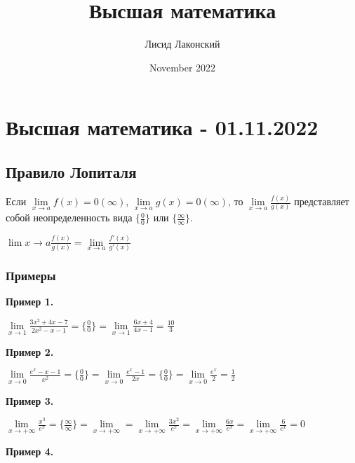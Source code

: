 \documentclass{article}
\title{Высшая математика}
\author{Лисид Лаконский}
\date{November 2022}
\begin{document}
\maketitle

\tableofcontents
\pagebreak

\section{Высшая математика - 01.11.2022}

\subsection{Правило Лопиталя}

\begin{flushleft}

Если $\lim\limits_{x \to a} f(x) = 0 (\infty)$, $\lim\limits_{x \to a} g(x) = 0 (\infty)$, то $\lim\limits_{x \to a} \frac{f(x)}{g(x)}$ представляет собой неопределенность вида $\{ \frac{0}{0} \}$ или $\{ \frac{\infty}{\infty} \}$.

\hfill

$\lim\limits{x \to a} \frac{f(x)}{g(x)} = \lim\limits_{x \to a} \frac{f'(x)}{g'(x)}$

\subsubsection{Примеры}

\textbf{Пример 1.}

$\lim\limits_{x \to 1} \frac{3x^2 + 4x - 7}{2x^2 - x - 1} = \{ \frac{0}{0} \} = \lim\limits_{x \to 1} \frac{6x + 4}{4x - 1} = \frac{10}{3}$

\hfill

\textbf{Пример 2.}

$\lim\limits_{x \to 0} \frac{e^x - x - 1}{x^2} = \{ \frac{0}{0} \} = \lim\limits_{x \to 0} \frac{e^x - 1}{2x} = \{ \frac{0}{0} \} = \lim\limits_{x \to 0} \frac{e^x}{2} = \frac{1}{2}$

\hfill

\textbf{Пример 3.}

$\lim\limits_{x \to +\infty} \frac{x^3}{e^x} = \{ \frac{\infty}{\infty} \} = \lim\limits_{x \to +\infty} = \lim\limits_{x \to +\infty} \frac{3x^2}{e^x} = \lim\limits_{x \to +\infty} \frac{6x}{e^x} = \lim\limits_{x \to +\infty} \frac{6}{e^x} = 0$

\hfill

\textbf{Пример 4.}


\end{flushleft}
\end{document}
